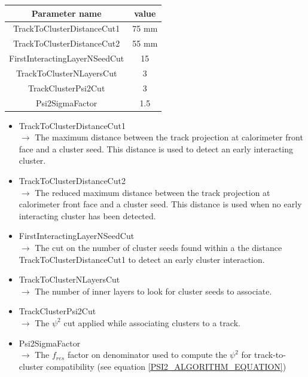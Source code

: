 \documentclass[cits]{JINST}
\begin{document}
\begin{table}[!ht]
  \begin{center}
    \begin{tabu} to \linewidth { c | c } 
          Parameter name & value \\
          \hline
          TrackToClusterDistanceCut1 & 75 mm \\
          TrackToClusterDistanceCut2 & 55 mm \\
          FirstInteractingLayerNSeedCut & 15 \\
          TrackToClusterNLayersCut & 3 \\
          TrackClusterPsi2Cut & 3 \\
          Psi2SigmaFactor & 1.5
    \end{tabu} 
  \end{center}
\end{table}

\begin{itemize}
  \item TrackToClusterDistanceCut1 \\
  $\rightarrow$ The maximum distance between the track projection at calorimeter front face and a cluster seed. This distance is used to detect an early interacting cluster.
  \item TrackToClusterDistanceCut2 \\
  $\rightarrow$ The reduced maximum distance between the track projection at calorimeter front face and a cluster seed. This distance is used when no early interacting cluster has been detected.
  \item FirstInteractingLayerNSeedCut \\
  $\rightarrow$ The cut on the number of cluster seeds found within a the distance TrackToClusterDistanceCut1 to detect an early cluster interaction.
  \item TrackToClusterNLayersCut \\
  $\rightarrow$ The number of inner layers to look for cluster seeds to associate.
  \item TrackClusterPsi2Cut \\
  $\rightarrow$ The $\psi^2$ cut applied while associating clusters to a track.
  \item Psi2SigmaFactor \\
  $\rightarrow$ The $f_{res}$ factor on denominator used to compute the $\psi^2$ for track-to-cluster compatibility (see equation \ref{PSI2_ALGORITHM_EQUATION})
\end{itemize}
\end{document}

